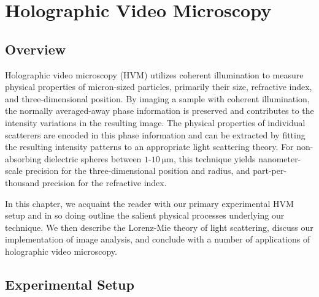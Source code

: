 \chapter{Holographic Video Microscopy}
\label{ch:hvm}


\newcommand{\einc}{\vec{E}_{\text{inc}}}
\newcommand{\escat}{\vec{E}_{\text{s}}}
\newcommand{\eadd}{\vec{E}_{\text{add}}}
\def\Plus{\texttt{+}}

\section{Overview}



Holographic video microscopy (HVM) utilizes coherent
illumination to measure physical properties of micron-sized particles,
primarily their size, refractive index, and three-dimensional position.
By imaging a sample with coherent illumination, the normally averaged-away
phase information is preserved and contributes to the intensity variations
in the resulting image. The physical properties of individual scatterers
are encoded in this phase information and can be extracted by fitting
the resulting intensity patterns to an appropriate light scattering theory.
For non-absorbing dielectric spheres between $\num{1}$-$\SI{10}{\um}$,
this technique yields nanometer-scale precision for the three-dimensional
position and radius, and part-per-thousand precision for the refractive index.

In this chapter, we acquaint the reader with our primary experimental
HVM setup and in so doing outline the salient physical processes underlying
our technique. We then describe the Lorenz-Mie theory of light
scattering, %
discuss our implementation of image analysis, and 
conclude with a number of applications of holographic video
microscopy.


\section{Experimental Setup}
\label{ch:hvm:sec:hvm}

